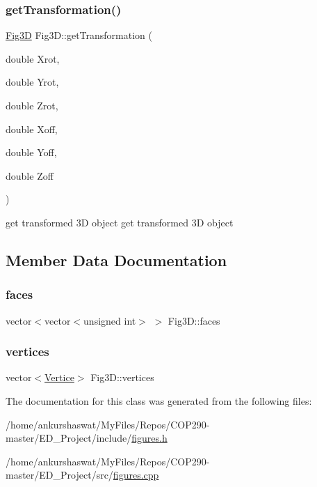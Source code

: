 \subsubsection{\texorpdfstring{get\+Transformation()}{getTransformation()}}
{\footnotesize\ttfamily \hyperlink{classFig3D}{Fig3D} Fig3\+D\+::get\+Transformation (\begin{DoxyParamCaption}\item[{double}]{Xrot,  }\item[{double}]{Yrot,  }\item[{double}]{Zrot,  }\item[{double}]{Xoff,  }\item[{double}]{Yoff,  }\item[{double}]{Zoff }\end{DoxyParamCaption})}

get transformed 3D object get transformed 3D object 

\subsection{Member Data Documentation}
\mbox{\label{classFig3D_abd9f97ce3404190fd202b12885d56fe3}} 
\subsubsection{\texorpdfstring{faces}{faces}}
{\footnotesize\ttfamily vector$<$vector$<$unsigned int$>$ $>$ Fig3\+D\+::faces}

\mbox{\label{classFig3D_a3d00aa545805c0c04563055cc183cbb9}} 
\subsubsection{\texorpdfstring{vertices}{vertices}}
{\footnotesize\ttfamily vector$<$\hyperlink{structVertice}{Vertice}$>$ Fig3\+D\+::vertices}



The documentation for this class was generated from the following files\+:\begin{DoxyCompactItemize}
\item 
/home/ankurshaswat/\+My\+Files/\+Repos/\+C\+O\+P290-\/master/\+E\+D\+\_\+\+Project/include/\hyperlink{figures_8h}{figures.\+h}\item 
/home/ankurshaswat/\+My\+Files/\+Repos/\+C\+O\+P290-\/master/\+E\+D\+\_\+\+Project/src/\hyperlink{figures_8cpp}{figures.\+cpp}\end{DoxyCompactItemize}
